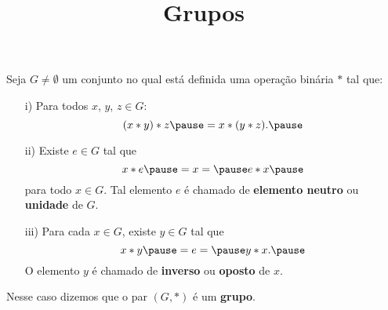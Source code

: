 \documentclass{beamer}
\title{Grupos}
\author[\autor]{\autor}
\institute[\instituto]{\instituto}
\date{}
\begin{document}
    \begin{frame}
        \maketitle
    \end{frame}


    \begin{frame}
        \begin{definicao}
            Seja $G \ne \emptyset$ \pause um conjunto no qual está definida uma operação binária $*$ \pause tal que:\pause
            \begin{enumerate}
                \item[i)] Para todos $x$, $y$, $z\in G$:\pause
                \[
                    (x*y)*z \pause = x*(y*z).\pause
                \]

                \item[ii)] Existe $e \in G$ \pause tal que\pause
                \[
                    x*e \pause = x = \pause e*x\pause
                \]
                para todo $x \in G$. \pause Tal elemento $e$ \pause é chamado de \textbf{elemento neutro} \pause ou \textbf{unidade} \pause de $G$.\pause

            \end{enumerate}
        \end{definicao}
    \end{frame}

    \begin{frame}
        \begin{definicao}
            \begin{enumerate}
                \item[iii)] Para cada $x \in G$, \pause existe $y \in G$ \pause tal que\pause
                \[
                    x*y \pause = e = \pause y*x.\pause
                \]
                O elemento $y$ \pause é chamado de \textbf{inverso} \pause ou \textbf{oposto} \pause de $x$.\pause
            \end{enumerate}
            Nesse caso dizemos que o par $(G, \ast )$ \pause é um \textbf{grupo}.\pause
        \end{definicao}
    \end{frame}
\end{document}
